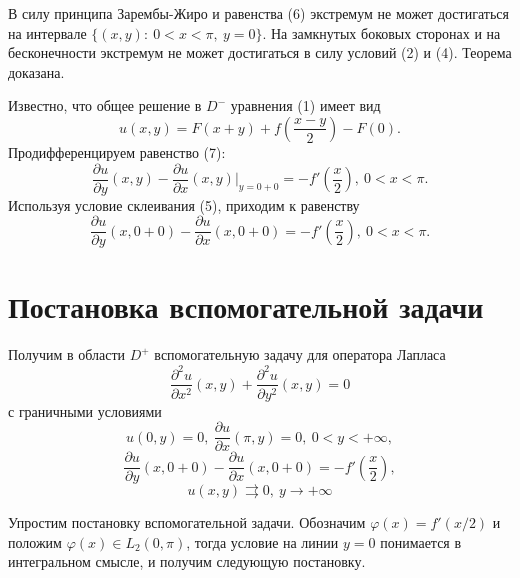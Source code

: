 \documentclass[12pt, a4paper]{article}
\begin{document}
В силу принципа Зарембы-Жиро и равенства (6) экстремум не может достигаться на интервале $\{(x,y):\ 0 < x < \pi, \ y = 0\}$. На замкнутых боковых сторонах и на бесконечности экстремум не может достигаться в силу условий (2) и (4). Теорема доказана.

Известно, что общее решение в $D^{-}$  уравнения (1) имеет вид 
\begin{equation}
	u(x,y) = F(x+y) + f(\dfrac{x-y}{2}) - F(0).
\end{equation}
Продифференцируем равенство (7):
\begin{equation*}
	\dfrac{\partial u}{\partial y}(x,y) - \dfrac{\partial u}{\partial x}(x,y) \vert_{y=0+0} = -f'\left(\dfrac{x}2\right), \ 0 < x < \pi.
\end{equation*}
Используя условие склеивания (5), приходим к равенству
\begin{equation*}
	\dfrac{\partial u}{\partial y}(x, 0+0) - \dfrac{\partial u}{\partial x}(x, 0 + 0) = - f'\left(\dfrac{x}2\right), \ 0 < x < \pi. 
\end{equation*}

\section{Постановка вспомогательной задачи}
	Получим в области $D^{+}$ вспомогательную задачу для оператора Лапласа 
\begin{equation}
	\dfrac{\partial^2 u}{\partial x^2}(x,y) + \dfrac{\partial^2 u}{\partial y^2}(x,y) = 0
\end{equation}
с граничными условиями 
\begin{equation}
	u(0,y) = 0, \ \dfrac{\partial u}{\partial x}(\pi, y) = 0, \ 0 < y < +\infty, 
\end{equation}
\begin{equation}
	\dfrac{\partial u}{\partial y}(x,0+0) - \dfrac{\partial u}{\partial x}(x,0+0) = -f'\left(\dfrac{x}{2}\right),
\end{equation}
\begin{equation}
	u(x,y) \rightrightarrows 0, \ y \to +\infty 
\end{equation}

Упростим постановку вспомогательной задачи. Обозначим $\varphi(x) = f'(x/2)$ и положим $\varphi(x) \in L_2(0, \pi)$, тогда условие на линии $y = 0$ понимается в интегральном смысле, и получим следующую постановку.
\end{document}
